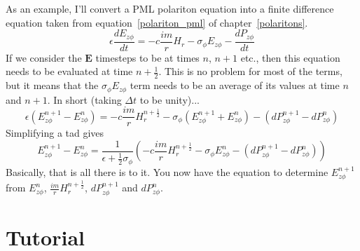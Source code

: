 \documentclass[floats]{book}
\begin{document}
As an example, I'll convert a PML polariton equation into a finite
difference equation taken from equation~\ref{polariton_pml} of
chapter~\ref{polaritons}.
\begin{equation*}
\epsilon\frac{dE_{z\phi}}{dt} = -c \frac{im}r H_r
             - \sigma_\phi E_{z\phi} - \frac{dP_{z\phi}}{dt}
\end{equation*}
If we consider the $\mathbf{E}$ timesteps to be at times $n$, $n+1$ etc.,
then this equation needs to be evaluated at time $n+\frac12$.  This is no
problem for most of the terms, but it means that the $\sigma_\phi
E_{z\phi}$ term needs to be an average of its values at time $n$ and
$n+1$.  In short (taking $\Delta t$ to be unity)...
\begin{equation*}
\epsilon (E_{z\phi}^{n+1} - E_{z\phi}^n) = -c \frac{im}r H_r^{n+\frac12}
  - \sigma_\phi ( E_{z\phi}^{n+1} + E_{z\phi}^n) - (dP_{z\phi}^{n+1} - dP_{z\phi}^n)
\end{equation*}
Simplifying a tad gives
\begin{equation*}
E_{z\phi}^{n+1} - E_{z\phi}^n = \frac1{\epsilon + \frac12\sigma_\phi}
    \left(-c \frac{im}r H_r^{n+\frac12}
  - \sigma_\phi E_{z\phi}^n - (dP_{z\phi}^{n+1} - dP_{z\phi}^n)\right)
\end{equation*}
Basically, that is all there is to it.  You now have the equation to
determine $E_{z\phi}^{n+1}$ from $E_{z\phi}^n$, $\frac{im}r
H_r^{n+\frac12}$, $dP_{z\phi}^{n+1}$ and $dP_{z\phi}^n$.

\chapter{Tutorial}



















\appendix


\end{document}
